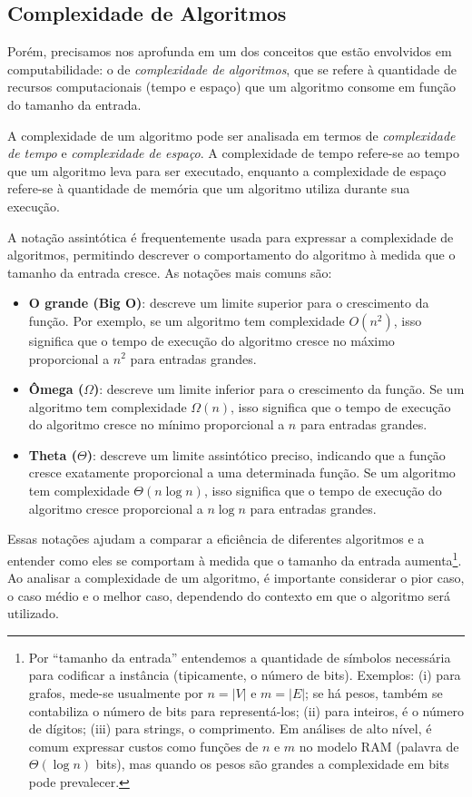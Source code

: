 \subsection{Complexidade de Algoritmos}


Porém, precisamos nos aprofunda em um dos conceitos que estão envolvidos em computabilidade: o de \emph{complexidade de algoritmos}, que se refere à quantidade de recursos computacionais (tempo e espaço) que um algoritmo consome em função do tamanho da entrada.


A complexidade de um algoritmo pode ser analisada em termos de \emph{complexidade de tempo} e \emph{complexidade de espaço}. A complexidade de tempo refere-se ao tempo que um algoritmo leva para ser executado, enquanto a complexidade de espaço refere-se à quantidade de memória que um algoritmo utiliza durante sua execução.


A notação assintótica é frequentemente usada para expressar a complexidade de algoritmos, permitindo descrever o comportamento do algoritmo à medida que o tamanho da entrada cresce. As notações mais comuns são:
\begin{itemize}\setlength{\itemsep}{2pt}
	\item \textbf{O grande (Big O)}: descreve um limite superior para o crescimento da função. Por exemplo, se um algoritmo tem complexidade \(O(n^2)\), isso significa que o tempo de execução do algoritmo cresce no máximo proporcional a \(n^2\) para entradas grandes.
	\item \textbf{Ômega (\(\Omega\))}: descreve um limite inferior para o crescimento da função. Se um algoritmo tem complexidade \(\Omega(n)\), isso significa que o tempo de execução do algoritmo cresce no mínimo proporcional a \(n\) para entradas grandes.
	\item \textbf{Theta (\(\Theta\))}: descreve um limite assintótico preciso, indicando que a função cresce exatamente proporcional a uma determinada função. Se um algoritmo tem complexidade \(\Theta(n \log n)\), isso significa que o tempo de execução do algoritmo cresce proporcional a \(n \log n\) para entradas grandes.
\end{itemize}


Essas notações ajudam a comparar a eficiência de diferentes algoritmos e a entender como eles se comportam à medida que o tamanho da entrada aumenta\footnote{Por “tamanho da entrada” entendemos a quantidade de símbolos necessária para codificar a instância (tipicamente, o número de bits). Exemplos: (i) para grafos, mede-se usualmente por \(n=|V|\) e \(m=|E|\); se há pesos, também se contabiliza o número de bits para representá-los; (ii) para inteiros, é o número de dígitos; (iii) para strings, o comprimento. Em análises de alto nível, é comum expressar custos como funções de \(n\) e \(m\) no modelo RAM (palavra de \(\Theta(\log n)\) bits), mas quando os pesos são grandes a complexidade em bits pode prevalecer.}. Ao analisar a complexidade de um algoritmo, é importante considerar o pior caso, o caso médio e o melhor caso, dependendo do contexto em que o algoritmo será utilizado.


